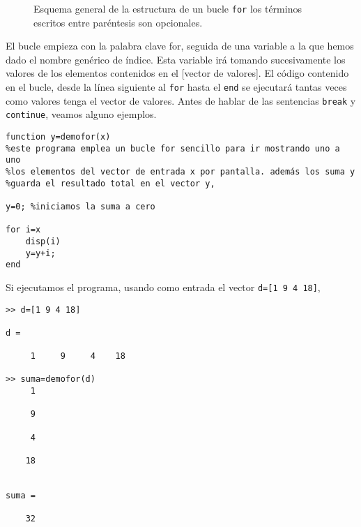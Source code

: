 \begin{figure}[h]
\centering
{}
\caption{Esquema general de la estructura de un bucle \texttt{for} los términos escritos entre paréntesis son opcionales.}
\label{fig:for}
\end{figure} 
 
El bucle empieza con la palabra clave for, seguida de una variable a la que hemos dado el nombre genérico de índice. Esta variable irá tomando sucesivamente los valores de los elementos contenidos en el [vector de valores]. El código contenido en el bucle, desde la línea siguiente al \texttt{for} hasta el \texttt{end} se ejecutará tantas veces como valores tenga el vector de valores. Antes de hablar de las sentencias \texttt{break} y \texttt{continue}, veamos alguno ejemplos.
\begin{verbatim}
function y=demofor(x)
%este programa emplea un bucle for sencillo para ir mostrando uno a uno
%los elementos del vector de entrada x por pantalla. además los suma y 
%guarda el resultado total en el vector y,

y=0; %iniciamos la suma a cero

for i=x
    disp(i)
    y=y+i;
end
\end{verbatim}

Si ejecutamos el programa, usando como entrada el vector \texttt{d=[1 9 4 18]},

\begin{verbatim}
>> d=[1 9 4 18]

d =

     1     9     4    18

>> suma=demofor(d)
     1

     9

     4

    18


suma =

    32
\end{verbatim}

